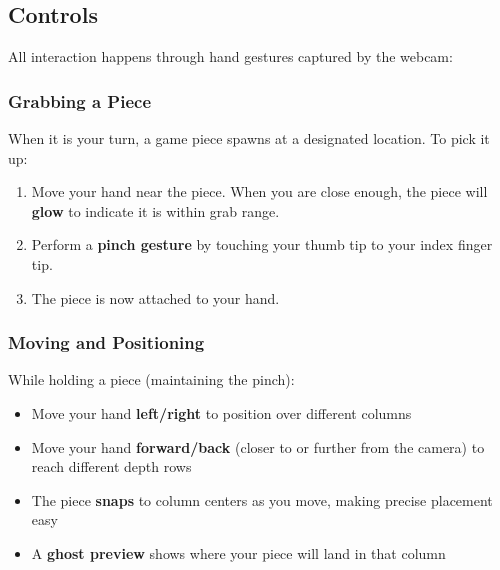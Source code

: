 \documentclass[11pt]{article}
\begin{document}

\subsection{Controls}

All interaction happens through hand gestures captured by the webcam:

\subsubsection{Grabbing a Piece}

When it is your turn, a game piece spawns at a designated location. To pick it up:

\begin{enumerate}
    \item Move your hand near the piece. When you are close enough, the piece will \textbf{glow} to indicate it is within grab range.
    \item Perform a \textbf{pinch gesture} by touching your thumb tip to your index finger tip.
    \item The piece is now attached to your hand.
\end{enumerate}


\subsubsection{Moving and Positioning}

While holding a piece (maintaining the pinch):

\begin{itemize}
    \item Move your hand \textbf{left/right} to position over different columns
    \item Move your hand \textbf{forward/back} (closer to or further from the camera) to reach different depth rows
    \item The piece \textbf{snaps} to column centers as you move, making precise placement easy
    \item A \textbf{ghost preview} shows where your piece will land in that column
\end{itemize}

\end{document}
